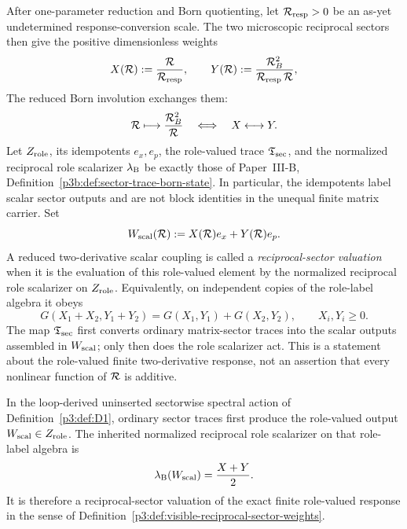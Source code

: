 \documentclass[12pt,a4paper]{article}
\begin{document}
\begin{definition}
\label{p3:def:visible-reciprocal-sector-weights}
After one-parameter reduction and Born quotienting, let
\(\mathcal R_{\rm resp}>0\) be an as-yet undetermined response-conversion scale.
The two microscopic reciprocal sectors then give the positive dimensionless
weights
\[
        X(\mathcal R):=\frac{\mathcal R}{\mathcal R_{\rm resp}},
        \qquad
        Y(\mathcal R):=\frac{\mathcal R_B^2}{\mathcal R_{\rm resp}\,\mathcal R},
\]
The reduced Born involution exchanges them:
\[
        \mathcal R\longmapsto \frac{\mathcal R_B^2}{\mathcal R}
        \quad\Longleftrightarrow\quad
        X\longleftrightarrow Y .
\]
Let \(Z_{\rm role}\), its idempotents \(e_x,e_p\), the role-valued trace
\(\mathfrak T_{\rm sec}\), and the normalized reciprocal role scalarizer \(\lambda_{\rm B}\)
be exactly those of Paper~III-B,
Definition~\ref{p3b:def:sector-trace-born-state}.  In particular, the
idempotents label scalar sector outputs and are not block identities in the
unequal finite matrix carrier.  Set
\begin{equation}
       W_{\rm scal}(\mathcal R):=X(\mathcal R)e_x+Y(\mathcal R)e_p.
       \label{p3:eq:visible-reciprocal-central-element}
\end{equation}
A reduced two-derivative scalar coupling is called a
\emph{reciprocal-sector valuation} when it is the evaluation of this
role-valued element by the normalized reciprocal role scalarizer on \(Z_{\rm role}\).
Equivalently, on independent copies of the role-label algebra it obeys
\[
        G(X_1+X_2,Y_1+Y_2)=G(X_1,Y_1)+G(X_2,Y_2),
        \qquad X_i,Y_i\ge 0 .
\]
The map \(\mathfrak T_{\rm sec}\) first converts ordinary matrix-sector
traces into the scalar outputs assembled in \(W_{\rm scal}\); only then does
the role scalarizer act.  This is a statement about the role-valued finite
two-derivative response, not an assertion that every nonlinear function of
\(\mathcal R\) is additive.
\end{definition}

\begin{lemma}
\label{p3:lem:spectral-trace-sector-valuation}
In the loop-derived uninserted sectorwise spectral action of
Definition~\ref{p3:def:D1}, ordinary sector traces first produce the
role-valued output \(W_{\rm scal}\in Z_{\rm role}\).  The inherited normalized reciprocal role scalarizer on that role-label algebra is
\begin{equation}
       \lambda_{\rm B}(W_{\rm scal})=\frac{X+Y}{2}.
       \label{p3:eq:reciprocal-central-normalized-trace}
\end{equation}
It is therefore a reciprocal-sector valuation of the exact finite
role-valued response in the sense of
Definition~\ref{p3:def:visible-reciprocal-sector-weights}.
\end{lemma}
\end{document}
